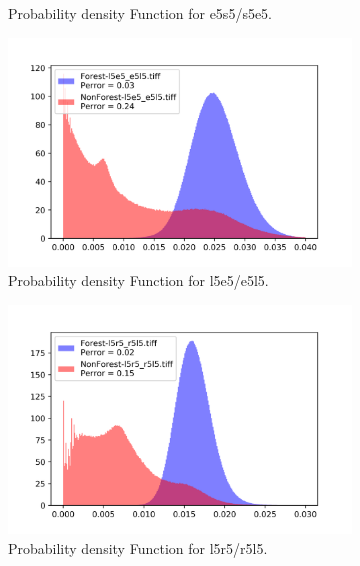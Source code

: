 \begin{figure}[H]
\begin{subfigure}[b]{0.4\linewidth}
     \caption{Probability density Function for e5s5/s5e5.}
  \end{subfigure}
  \centering
  \begin{subfigure}[b]{0.4\linewidth}
    \includegraphics[width=\linewidth]{Chapter4/laws_textures/l5e5_e5l5.png}
     \caption{Probability density Function for l5e5/e5l5.}
  \end{subfigure}
  \centering
  \begin{subfigure}[b]{0.4\linewidth}
    \includegraphics[width=\linewidth]{Chapter4/laws_textures/l5r5_r5l5.png}
     \caption{Probability density Function for l5r5/r5l5.}
  \end{subfigure}
  \centering
  \begin{subfigure}[b]{0.4\linewidth}

\end{subfigure}
\end{figure}
